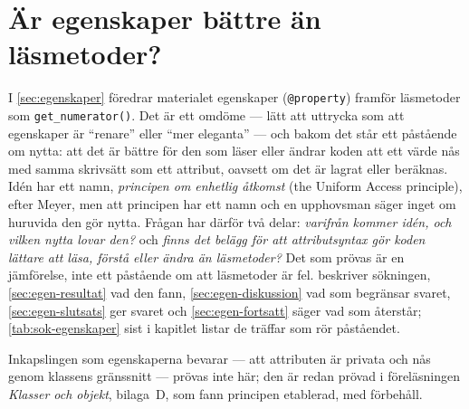 \begingroup
\ifdefined\marginnotebesidefloats{}\fi
\marginheightadjustment=48pt
\makeatletter\setlength{\@fptop}{0pt}\makeatother
\renewcommand{\foottextfont}{\scriptsize\mpjustification}
\chapter{Är egenskaper bättre än läsmetoder?}
\label{app:egenskaper}

I \cref{sec:egenskaper} föredrar materialet egenskaper
(\texttt{@property}) framför läsmetoder som
\texttt{get_numerator()}.  Det är ett omdöme --- lätt att
uttrycka som att egenskaper är \enquote{renare} eller \enquote{mer
eleganta} --- och bakom det står ett påstående om nytta: att det är
bättre för den som läser eller ändrar
koden att ett värde nås med samma skrivsätt som ett attribut, oavsett om
det är lagrat eller beräknas.  Idén har ett namn,
\emph{principen om enhetlig åtkomst}
(\foreignlanguage{english}{the Uniform Access principle}), efter
Meyer\autocite{Meyer1997OOSC}, men att principen har ett namn och en
upphovsman säger inget om huruvida den gör nytta.  Frågan har därför två
delar: \emph{varifrån kommer idén, och vilken nytta lovar den?}  och
\emph{finns det belägg för att attributsyntax gör koden lättare att
läsa, förstå eller ändra än läsmetoder?}  Det som prövas är en
jämförelse, inte ett påstående om att läsmetoder är fel.
 beskriver sökningen, \cref{sec:egen-resultat}
vad den fann, \cref{sec:egen-diskussion} vad som begränsar svaret,
\cref{sec:egen-slutsats} ger svaret och \cref{sec:egen-fortsatt} säger
vad som återstår; \cref{tab:sok-egenskaper} sist i kapitlet listar de
träffar som rör påståendet.

Inkapslingen som egenskaperna bevarar --- att attributen är privata och
nås genom klassens gränssnitt --- prövas inte här; den är redan prövad i
föreläsningen \emph{Klasser och objekt}, bilaga~D, som fann principen
etablerad, med förbehåll.

